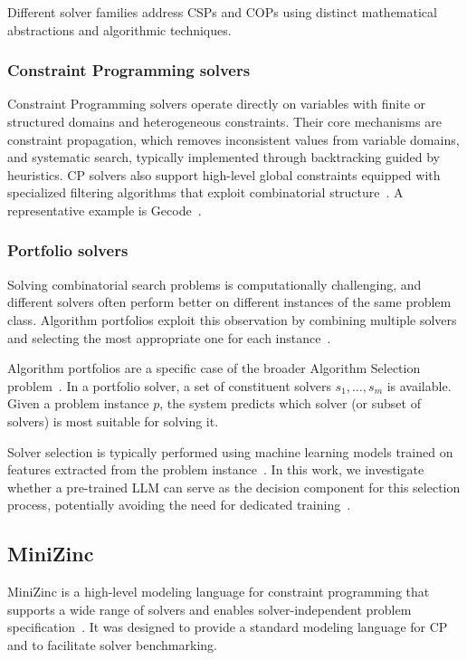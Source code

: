 \documentclass[../../main]{subfiles}
\begin{document}
Different solver families address CSPs and COPs using distinct mathematical abstractions and algorithmic techniques.

\subsubsection{Constraint Programming solvers}

Constraint Programming solvers operate directly on variables with finite or structured domains and heterogeneous constraints. Their core mechanisms are constraint propagation, which removes inconsistent values from variable domains, and systematic search, typically implemented through backtracking guided by heuristics. CP solvers also support high-level global constraints equipped with specialized filtering algorithms that exploit combinatorial structure~\cite{CPvsMILPsolvers}. A representative example is Gecode~\cite{Gecode}.

\subsubsection{Portfolio solvers}

Solving combinatorial search problems is computationally challenging, and different solvers often perform better on different instances of the same problem class. Algorithm portfolios exploit this observation by combining multiple solvers and selecting the most appropriate one for each instance~\cite{PortfolioSolvers}.

Algorithm portfolios are a specific case of the broader Algorithm Selection problem~\cite{AlgSelProb}. In a portfolio solver, a set of constituent solvers \(s_1, \dots, s_m\) is available. Given a problem instance \(p\), the system predicts which solver (or subset of solvers) is most suitable for solving it.

Solver selection is typically performed using machine learning models trained on features extracted from the problem instance~\cite{AlgSelCSP}. In this work, we investigate whether a pre-trained LLM can serve as the decision component for this selection process, potentially avoiding the need for dedicated training~\cite{fromPFStoAS}.

\subsection{MiniZinc}

MiniZinc is a high-level modeling language for constraint programming that supports a wide range of solvers and enables solver-independent problem specification~\cite{MiniZinc}. It was designed to provide a standard modeling language for CP and to facilitate solver benchmarking.
\end{document}
